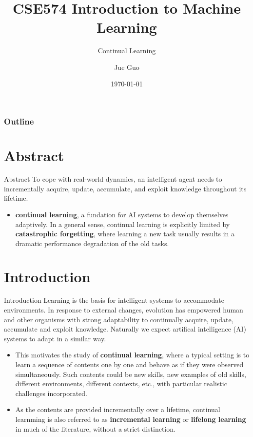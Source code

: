 \documentclass[9pt,dvipsnames]{beamer}
\title{CSE574 Introduction to Machine Learning}
\subtitle{Continual Learning}
\author{Jue Guo}
\institute{University at Buffalo}
\date{\today}
\begin{document}
\begin{frame}
    \titlepage
\end{frame}

\begin{frame}
    \frametitle{Outline}
    \tableofcontents
\end{frame}

\section{Abstract}
\begin{frame}{Abstract}
    To cope with real-world dynamics, an intelligent agent needs to incrementally acquire, update, accumulate, and exploit knowledge throughout its lifetime.
    \begin{itemize}
        \item \textbf{continual learning}, a fundation for AI systems to develop themselves adaptively. In a general sense, continual learning is explicitly limited by \textbf{catastrophic forgetting}, where learning a new task usually results in a dramatic performance degradation of the old tasks.
    \end{itemize}
\end{frame}

\section{Introduction}
\begin{frame}{Introduction}
    Learning is the basis for intelligent systems to accommodate environments. In response to external changes, evolution has empowered human and other organisms with strong adaptability to continually acquire, update, accumulate and exploit knowledge. Naturally we expect artifical intelligence (AI) systems to adapt in a similar way.
    \begin{itemize}
        \item This motivates the study of \textbf{continual learning}, where a typical setting is to learn a sequence of contents one by one and behave as if they were observed simultaneously. Such contents could be new skills, new examples of old skills, different environments, different contexts, etc., with particular realistic challenges incorporated.
        \item As the contents are provided incrementally over a lifetime, continual learnming is also referred to as \textbf{incremental learning} or \textbf{lifelong learning} in much of the literature, without a strict distinction.
    \end{itemize}
\end{frame}
\end{document}
